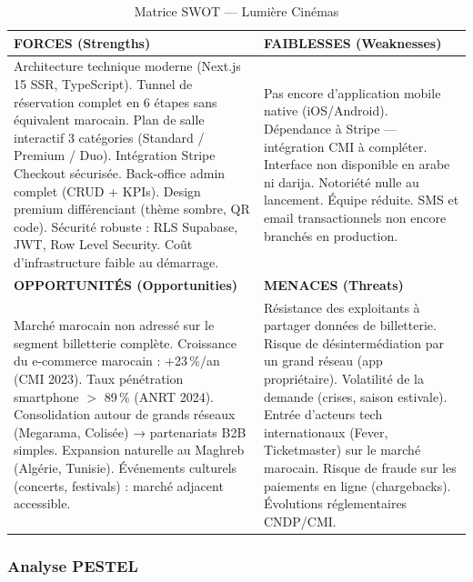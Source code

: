 \documentclass[12pt,a4paper,openany]{report}
\begin{document}
\begin{table}[H]
\centering
\small
\begin{tabularx}{\textwidth}{|X|X|}
\hline
\cellcolor{green!20}\textbf{FORCES (Strengths)} & \cellcolor{red!15}\textbf{FAIBLESSES (Weaknesses)} \\
\hline
Architecture technique moderne (Next.js 15 SSR, TypeScript). Tunnel de réservation complet en 6 étapes sans équivalent marocain. Plan de salle interactif 3 catégories (Standard / Premium / Duo). Intégration Stripe Checkout sécurisée. Back-office admin complet (CRUD + KPIs). Design premium différenciant (thème sombre, QR code). Sécurité robuste : RLS Supabase, JWT, Row Level Security. Coût d'infrastructure faible au démarrage.
&
Pas encore d'application mobile native (iOS/Android). Dépendance à Stripe — intégration CMI à compléter. Interface non disponible en arabe ni darija. Notoriété nulle au lancement. Équipe réduite. SMS et email transactionnels non encore branchés en production. \\
\hline
\cellcolor{blue!15}\textbf{OPPORTUNITÉS (Opportunities)} & \cellcolor{orange!15}\textbf{MENACES (Threats)} \\
\hline
Marché marocain non adressé sur le segment billetterie complète. Croissance du e-commerce marocain : +23\,\%/an (CMI 2023). Taux pénétration smartphone $>$ 89\,\% (ANRT 2024). Consolidation autour de grands réseaux (Megarama, Colisée) → partenariats B2B simples. Expansion naturelle au Maghreb (Algérie, Tunisie). Événements culturels (concerts, festivals) : marché adjacent accessible.
&
Résistance des exploitants à partager données de billetterie. Risque de désintermédiation par un grand réseau (app propriétaire). Volatilité de la demande (crises, saison estivale). Entrée d'acteurs tech internationaux (Fever, Ticketmaster) sur le marché marocain. Risque de fraude sur les paiements en ligne (chargebacks). Évolutions réglementaires CNDP/CMI. \\
\hline
\end{tabularx}
\caption{Matrice SWOT — Lumière Cinémas}
\label{tab:swot}
\end{table}

\subsubsection{Analyse PESTEL}
\end{document}
